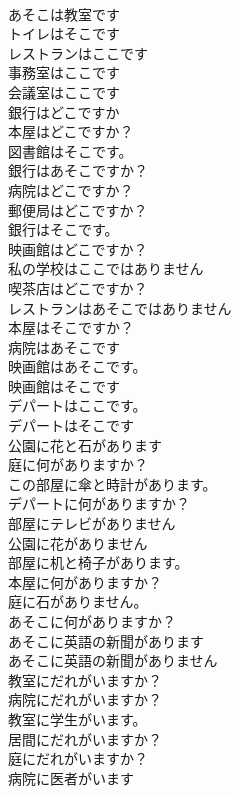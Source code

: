 \documentclass[8pt]{extreport}
\begin{document}
\begin{CJK}{UTF8}{min}
\\	あそこは教室です	
\\	トイレはそこです	
\\	レストランはここです	
\\	事務室はここです	
\\	会議室はここです	
\\	銀行はどこですか	
\\	本屋はどこですか？	
\\	図書館はそこです。	
\\	銀行はあそこですか？	
\\	病院はどこですか？	
\\	郵便局はどこですか？	
\\	銀行はそこです。	
\\	映画館はどこですか？	
\\	私の学校はここではありません	
\\	喫茶店はどこですか？	
\\	レストランはあそこではありません	
\\	本屋はそこですか？	
\\	病院はあそこです	
\\	映画館はあそこです。	
\\	映画館はそこです	
\\	デパートはここです。	
\\	デパートはそこです	
\\	公園に花と石があります	
\\	庭に何がありますか？	
\\	この部屋に傘と時計があります。	
\\	デパートに何がありますか？	
\\	部屋にテレビがありません	
\\	公園に花がありません	
\\	部屋に机と椅子があります。	
\\	本屋に何がありますか？	
\\	庭に石がありません。	
\\	あそこに何がありますか？	
\\	あそこに英語の新聞があります	
\\	あそこに英語の新聞がありません	
\\	教室にだれがいますか？	
\\	病院にだれがいますか？	
\\	教室に学生がいます。	
\\	居間にだれがいますか？	
\\	庭にだれがいますか？	
\\	病院に医者がいます	

\end{CJK}
\end{document}
